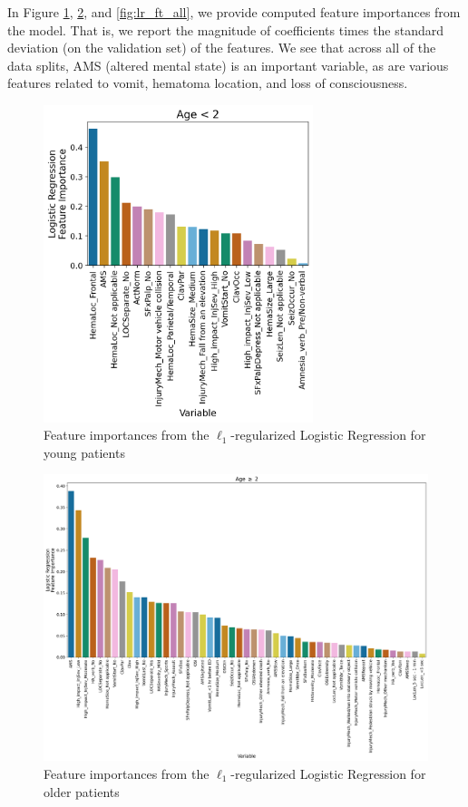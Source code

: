\documentclass[11pt, letterpaper]{amsart}
\begin{document}
In Figure \ref{fig:lr_ft_young}, \ref{fig:lr_ft_old}, and \ref{fig:lr_ft_all}, we provide computed feature importances from the model. That is, we report the magnitude of coefficients times the standard deviation (on the validation set) of the features. We see that across all of the data splits, AMS (altered mental state) is an important variable, as are various features related to vomit, hematoma location, and loss of consciousness. 
\begin{figure}
	\centering
	\includegraphics[width=0.7\textwidth]{lr_feat_importance_young.png}
	\caption{Feature importances from the $\ell_1$-regularized Logistic Regression for young patients}\label{fig:lr_ft_young}
\end{figure}
\begin{figure}
	\centering
	\includegraphics[width=\textwidth]{lr_feat_importance_old.png}
	\caption{Feature importances from the $\ell_1$-regularized Logistic Regression for older patients}\label{fig:lr_ft_old}
\end{figure}
\end{document}
